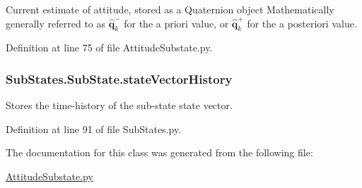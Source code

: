 Current estimate of attitude, stored as a Quaternion object Mathematically generally referred to as $\mathbf{\hat{q}}^{-}_{k}$ for the a priori value, or $\mathbf{\hat{q}}^{+}_{k}$ for the a posteriori value. 



Definition at line 75 of file Attitude\+Substate.\+py.

\subsubsection[{\texorpdfstring{state\+Vector\+History}{stateVectorHistory}}]{\setlength{\rightskip}{0pt plus 5cm}Sub\+States.\+Sub\+State.\+state\+Vector\+History\hspace{0.3cm}{\ttfamily [inherited]}}\hypertarget{classSubStates_1_1SubState_a24bf2de56fc3037d91cba43d28f3bf60}{}\label{classSubStates_1_1SubState_a24bf2de56fc3037d91cba43d28f3bf60}


Stores the time-\/history of the sub-\/state state vector. 



Definition at line 91 of file Sub\+States.\+py.



The documentation for this class was generated from the following file\+:\begin{DoxyCompactItemize}
\item 
\hyperlink{AttitudeSubstate_8py}{Attitude\+Substate.\+py}\end{DoxyCompactItemize}
